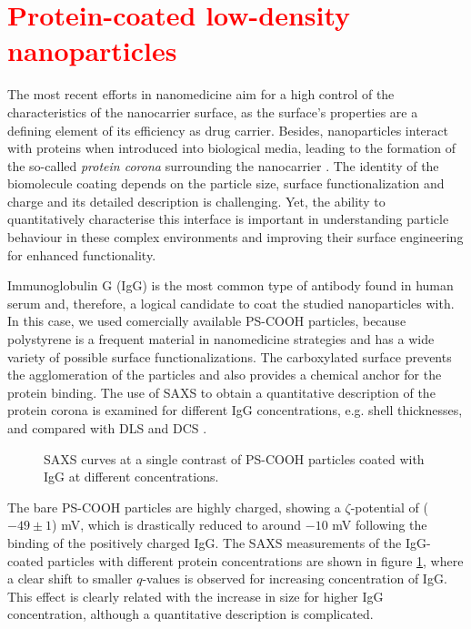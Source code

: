 \section{\textcolor{red}{Protein-coated low-density nanoparticles}}
\label{sec:CoatedKiskerExperimental}
The most recent efforts in nanomedicine aim for a high control of the characteristics of the nanocarrier surface, as the surface's properties are a defining element of its efficiency as drug carrier. Besides, nanoparticles interact with proteins when introduced into biological media, leading to the formation of the so-called \emph{protein corona} surrounding the nanocarrier \citep{cedervall_understanding_2007,monopoli_physicalchemical_2011,casals_time_2010}. The identity of the biomolecule coating depends on the particle size, surface functionalization and charge \citep{lundqvist_nanoparticle_2008,tenzer_rapid_2013,gessner_functional_2003} and its detailed description is challenging. Yet, the ability to quantitatively characterise this interface is important in understanding particle behaviour in these complex environments and improving their surface engineering for enhanced functionality.

Immunoglobulin G (IgG) is the most common type of antibody found in human serum and, therefore, a logical candidate to coat the studied nanoparticles with. In this case, we used comercially available PS-COOH particles, because polystyrene is a frequent material in nanomedicine strategies and has a wide variety of possible surface functionalizations. The carboxylated surface prevents the agglomeration of the particles and also provides a chemical anchor for the protein binding. The use of SAXS to obtain a quantitative description of the protein corona is examined for different IgG concentrations, e.g. shell thicknesses, and compared with DLS and DCS \citep{minelli_characterization_2014}.

\begin{figure}
	\centering
		
		\caption[Scattering curves of PS-COOH particles coated with IgG.]{SAXS curves at a single contrast of PS-COOH particles coated with IgG at different concentrations.}
		\label{fig:CoatedKiskerIgGSingleContrastSAXS}
\end{figure}

The bare PS-COOH particles are highly charged, showing a $\zeta$-potential of ($-49 \pm 1$) mV, which is drastically reduced to around $ -10$ mV following the binding of the positively charged IgG. The SAXS measurements of the IgG-coated particles with different protein concentrations are shown in figure \ref{fig:CoatedKiskerIgGSingleContrastSAXS}, where a clear shift to smaller $q$-values is observed for increasing concentration of IgG. This effect is clearly related with the increase in size for higher IgG concentration, although a quantitative description is complicated.

